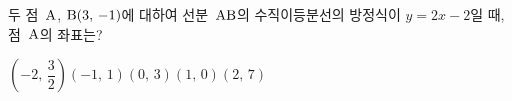 두 점~$\mathrm{A}$, $\mathrm{B}(3,\,-1)$에 대하여 선분~$\mathrm{AB}$의 수직이등분선의 방정식이 $y=2x-2$일 때, 점~$\mathrm{A}$의 좌표는?
\begin{choicesii}{$\left(-2,\,\dfrac{3}{2}\right)$}{$(-1,\,1)$}{$(0,\,3)$}{$(1,\,0)$}{$(2,\,7)$}\end{choicesii}
